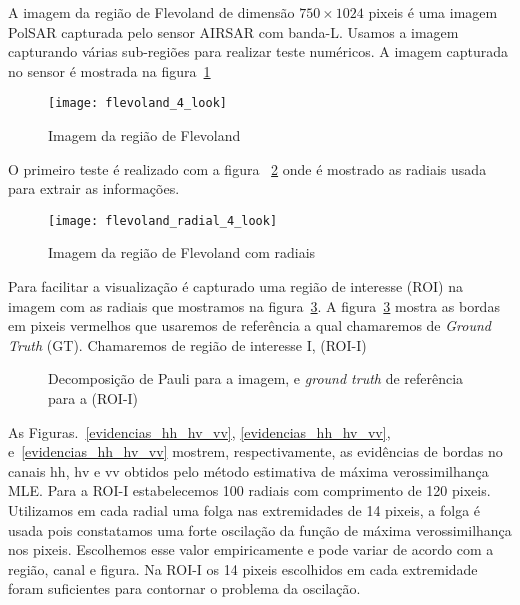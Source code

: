 A imagem da região de Flevoland de dimensão $750\times 1024$ pixeis é uma imagem PolSAR capturada pelo sensor AIRSAR com banda-L. Usamos a imagem capturando várias sub-regiões para realizar teste numéricos. A imagem capturada no sensor é mostrada na figura~\ref{flevoland_4_look} 
\begin{figure}[hbt]
	\centering
	\texttt{[image: flevoland\_4\_look]}%
	\caption{Imagem da região de Flevoland}
\label{flevoland_4_look}
\end{figure}

O primeiro teste é realizado com a figura ~\ref{flevoland_4_look_radial} onde é mostrado as radiais usada para extrair as informações. 
\begin{figure}[hbt]
	\centering
	\texttt{[image: flevoland\_radial\_4\_look]}%
	\caption{Imagem da região de Flevoland com radiais}
\label{flevoland_4_look_radial}
\end{figure}

Para facilitar a visualização é capturado uma região de interesse (ROI) na imagem com as radiais que mostramos na figura~\ref{roi_gt}. A figura~\ref{roi_gt} mostra as bordas em pixeis vermelhos que usaremos de referência a qual chamaremos de \textit{Ground Truth} (GT). Chamaremos de região de interesse I, (ROI-I)  
\begin{figure}[hbt]
   \centering
    \caption{Decomposição de Pauli para a imagem, e \textit{ground truth} de referência para a (ROI-I)}
    \label{roi_gt}
\end{figure}

As Figuras.~\ref{evidencias_hh_hv_vv}, \ref{evidencias_hh_hv_vv}, e~\ref{evidencias_hh_hv_vv} mostrem, respectivamente, as evidências de bordas no canais $\text{hh}$, $\text{hv}$ e $\text{vv}$ obtidos pelo método estimativa de máxima verossimilhança MLE. Para a ROI-I estabelecemos 100 radiais com comprimento de 120 pixeis. Utilizamos em cada radial uma folga nas extremidades de  14 pixeis, a folga é usada pois constatamos uma forte oscilação da função de máxima verossimilhança nos pixeis. Escolhemos esse valor empiricamente e pode variar de acordo com a região, canal e figura. Na ROI-I os 14 pixeis escolhidos em cada extremidade foram suficientes para contornar o problema da oscilação.

